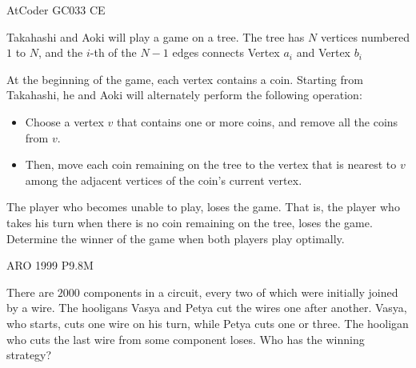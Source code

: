 {AtCoder GC033 C}{E}{
    Takahashi and Aoki will play a game on a tree. The tree has $ N $
    vertices numbered $ 1 $ to $ N $, and the $ i $-th of the $ N-1 $ edges
    connects Vertex $ a_i $ and Vertex $ b_i $

    At the beginning of the game, each vertex contains a coin. Starting from
    Takahashi, he and Aoki will alternately perform the following operation:

    \begin{itemize} 
        \item Choose a vertex $ v $ that contains one or more
            coins, and remove all the coins from $ v $.  
        \item Then, move each coin remaining on the tree to the vertex that is
            nearest to $v$ among the adjacent vertices of the coin's current vertex.
    \end{itemize}

    The player who becomes unable to play, loses the game. That is, the player who
    takes his turn when there is no coin remaining on the tree, loses the game.
    Determine the winner of the game when both players play
    optimally.

}



{ARO 1999 P9.8}{M}{
    There are $2000$ components in a circuit, every two of which were
    initially joined by a wire. The hooligans Vasya and Petya cut the wires one
    after another. Vasya, who starts, cuts one wire on his turn, while Petya cuts
    one or three. The hooligan who cuts the last wire from some component loses.
    Who has the winning strategy?
    
}

